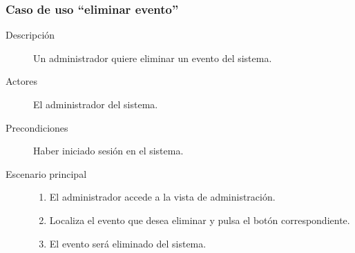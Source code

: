 \subsubsection{Caso de uso ``eliminar evento''}
\begin{description}
\item[Descripción]  Un administrador quiere eliminar un evento del sistema.
\item[Actores] El administrador del sistema.
\item[Precondiciones]  Haber iniciado sesión en el sistema.
\item[Escenario principal]	\hfill
							\begin{enumerate}
							\item El administrador accede a la vista de administración.
							\item Localiza el evento que desea eliminar y pulsa el botón correspondiente.
							\item El evento será eliminado del sistema.
							\end{enumerate}
\end{description}